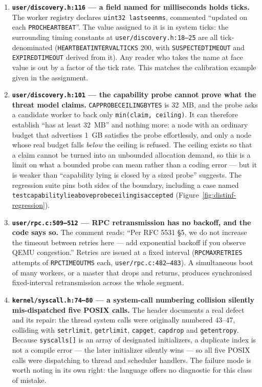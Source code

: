 \documentclass[11pt]{article}
\renewcommand{\_}{\origunderscore\allowbreak}
\begin{document}
\begin{enumerate}[leftmargin=1.4cm, itemsep=8pt]

\item \textbf{\texttt{user/discovery.h:116} --- a field named for milliseconds holds ticks.} The worker registry declares \texttt{uint32 last\_seen\_ms}, commented ``updated on each \texttt{PROC\_HEARTBEAT}''. The value assigned to it is in system ticks: the surrounding timing constants at \texttt{user/discovery.h:18--25} are all tick-denominated (\texttt{HEARTBEAT\_INTERVAL\_TICKS} 200, with \texttt{SUSPECTED\_TIMEOUT} and \texttt{EXPIRED\_TIMEOUT} derived from it). Any reader who takes the name at face value is out by a factor of the tick rate. This matches the calibration example given in the assignment.

\item \textbf{\texttt{user/discovery.h:101} --- the capability probe cannot prove what the threat model claims.} \texttt{CAP\_PROBE\_CEILING\_BYTES} is 32~MB, and the probe asks a candidate worker to back only \texttt{min(claim, ceiling)}. It can therefore establish ``has at least 32~MB'' and nothing more: a node with an ordinary budget that advertises 1~GB satisfies the probe effortlessly, and only a node whose real budget falls \emph{below} the ceiling is refused. The ceiling exists so that a claim cannot be turned into an unbounded allocation demand, so this is a limit on what a bounded probe can mean rather than a coding error --- but it is weaker than ``capability lying is closed by a sized probe'' suggests. The regression suite pins both sides of the boundary, including a case named \texttt{test\_capability\_lie\_above\_probe\_ceiling\_is\_accepted} (Figure~\ref{fig:distinf-regression}).

\item \textbf{\texttt{user/rpc.c:509--512} --- RPC retransmission has no backoff, and the code says so.} The comment reads: ``Per RFC 5531 \S5, we do not increase the timeout between retries here --- add exponential backoff if you observe QEMU congestion.'' Retries are issued at a fixed interval (\texttt{RPC\_MAX\_RETRIES} attempts of \texttt{RPC\_TIMEOUT\_MS} each, \texttt{user/rpc.c:482--483}). A simultaneous boot of many workers, or a master that drops and returns, produces synchronised fixed-interval retransmission across the whole segment.

\item \textbf{\texttt{kernel/syscall.h:74--80} --- a system-call numbering collision silently mis-dispatched five POSIX calls.} The header documents a real defect and its repair: the thread system calls were originally numbered 43--47, colliding with \texttt{setrlimit}, \texttt{getrlimit}, \texttt{capget}, \texttt{capdrop} and \texttt{getentropy}. Because \texttt{syscalls[]} is an array of designated initializers, a duplicate index is not a compile error --- the later initializer silently wins --- so all five POSIX calls were dispatching to thread and scheduler handlers. The failure mode is worth noting in its own right: the language offers no diagnostic for this class of mistake.


\end{enumerate}
\end{document}
